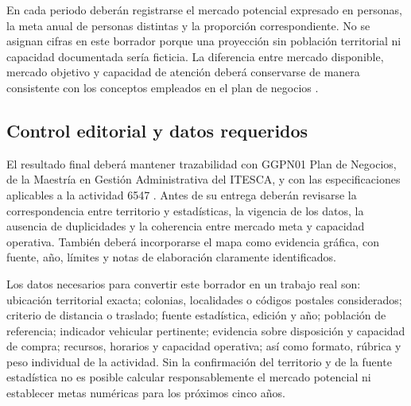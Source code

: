 \documentclass[12pt,letterpaper,oneside]{article}
\begin{document}
En cada periodo deberán registrarse el mercado potencial expresado en personas, la meta anual de personas distintas y la proporción correspondiente. No se asignan cifras en este borrador porque una proyección sin población territorial ni capacidad documentada sería ficticia. La diferencia entre mercado disponible, mercado objetivo y capacidad de atención deberá conservarse de manera consistente con los conceptos empleados en el plan de negocios \autocite{planNegociosGlosario2024}.

\subsection{Control editorial y datos requeridos}

El resultado final deberá mantener trazabilidad con GGPN01 Plan de Negocios, de la Maestría en Gestión Administrativa del ITESCA, y con las especificaciones aplicables a la actividad 6547 \autocite{itescaPlanNegociosEspecificaciones2026}. Antes de su entrega deberán revisarse la correspondencia entre territorio y estadísticas, la vigencia de los datos, la ausencia de duplicidades y la coherencia entre mercado meta y capacidad operativa. También deberá incorporarse el mapa como evidencia gráfica, con fuente, año, límites y notas de elaboración claramente identificados.

Los datos necesarios para convertir este borrador en un trabajo real son: ubicación territorial exacta; colonias, localidades o códigos postales considerados; criterio de distancia o traslado; fuente estadística, edición y año; población de referencia; indicador vehicular pertinente; evidencia sobre disposición y capacidad de compra; recursos, horarios y capacidad operativa; así como formato, rúbrica y peso individual de la actividad. Sin la confirmación del territorio y de la fuente estadística no es posible calcular responsablemente el mercado potencial ni establecer metas numéricas para los próximos cinco años.
\clearpage
\printbibliography[title={Fuentes de consulta}]
\end{document}
